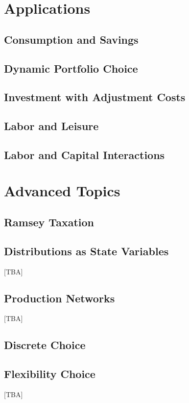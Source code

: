 \documentclass[12pt,openany]{book}
\begin{document}
\part{Applications}
\label{part:applications}

\chapter{Consumption and Savings}
\label{ch:consumption-savings}



\chapter{Dynamic Portfolio Choice}
\label{ch:dynamic-portfolio}



\chapter{Investment with Adjustment Costs}





\chapter{Labor and Leisure}
\label{ch:labor-leisure}



\chapter{Labor and Capital Interactions}
\label{ch:labor-leisure}



\part{Advanced Topics}
\label{part:advanced}

\chapter{Ramsey Taxation}

\chapter{Distributions as State Variables}

[TBA]

\chapter{Production Networks}

[TBA]

\chapter{Discrete Choice}



\chapter{Flexibility Choice}

[TBA]

\backmatter


\end{document}
